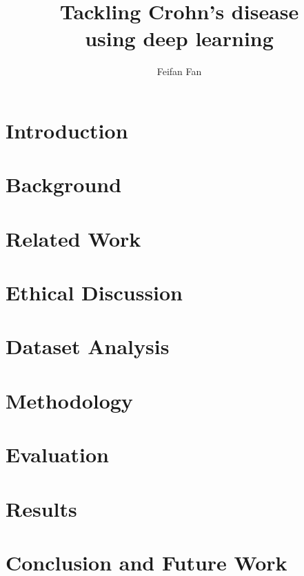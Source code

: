 \documentclass[a4paper,11pt]{report}
\begin{document}
\title{Tackling Crohn's disease \\ using deep learning}
\author{Feifan Fan}





\tableofcontents
\listoffigures

\chapter{Introduction}


\chapter{Background}
\label{cha:background}


\chapter{Related Work}


\chapter{Ethical Discussion}


\chapter{Dataset Analysis}


\chapter{Methodology}
\label{cha:Methodology}


\chapter{Evaluation}
\label{cha:evaluation}


\chapter{Results}


\chapter{Conclusion and Future Work}
\label{cha:Conclusion}



\end{document}

